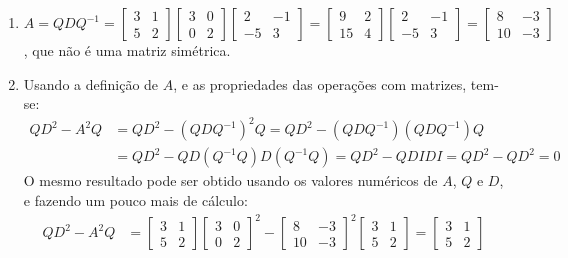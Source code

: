 \documentclass[12pt,a4paper]{article}
\begin{document}
\begin{ExerciseList}
\begin{enumerate}
\item $A
= QDQ^{-1}
=
\begin{bmatrix}
3 & 1\\
5 & 2
\end{bmatrix}
\begin{bmatrix}
3 & 0\\
0 & 2
\end{bmatrix}
\begin{bmatrix}
2 & -1 \\
-5 & 3
\end{bmatrix}
=
\begin{bmatrix}
9 & 2\\
15 & 4
\end{bmatrix}
\begin{bmatrix}
2 & -1 \\
-5 & 3
\end{bmatrix}
=
\begin{bmatrix}
8 & -3 \\
10 & -3
\end{bmatrix}
$, que não é uma matriz simétrica.
\item Usando a definição de $A$, e as propriedades das operações com matrizes, tem-se:
\begin{align*}
Q D^2 - A^2 Q
& = Q D^2 - (QDQ^{-1})^2 Q
  = Q D^2 - (QDQ^{-1})(QDQ^{-1}) Q \\
& = Q D^2 - QD(Q^{-1}Q)D(Q^{-1}Q)
  = Q D^2 - QDIDI
  = Q D^2 - QD^2
  = 0
\end{align*}
O mesmo resultado pode ser obtido usando os valores numéricos de $A$, $Q$ e $D$, e fazendo um pouco mais de cálculo:
\begin{align*}
Q D^2 - A^2 Q
& =
\begin{bmatrix}
3 & 1 \\
5 & 2
\end{bmatrix}
\begin{bmatrix}
3 & 0 \\
0 & 2
\end{bmatrix}^2
-
\begin{bmatrix}
 8 & -3 \\
10 & -3
\end{bmatrix}^2
\begin{bmatrix}
3 & 1 \\
5 & 2
\end{bmatrix}
 =
\begin{bmatrix}
3 & 1 \\
5 & 2
\end{bmatrix}

\end{align*}
\end{enumerate}
\end{ExerciseList}
\end{document}
